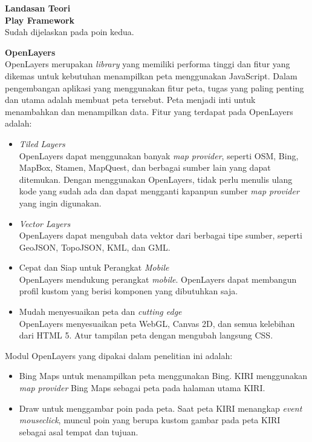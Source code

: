 \documentclass[a4paper,twoside]{article}
\begin{document}
\begin{enumerate}
	
	
\textbf{Landasan Teori}\\

\textbf{Play Framework}\\
Sudah dijelaskan pada poin kedua.

\textbf{OpenLayers}\\
OpenLayers \cite{openlayersbook} merupakan \textit{library} yang memiliki performa tinggi dan fitur yang dikemas untuk kebutuhan menampilkan peta menggunakan JavaScript. Dalam pengembangan aplikasi yang menggunakan fitur peta, tugas yang paling penting dan utama adalah membuat peta tersebut. Peta menjadi inti untuk menambahkan dan menampilkan data. Fitur yang terdapat pada OpenLayers adalah:

\begin{itemize}
\item \textit{Tiled Layers}\\
			OpenLayers dapat menggunakan banyak \textit{map provider}, seperti OSM, Bing, MapBox, Stamen, MapQuest, dan berbagai sumber lain yang dapat ditemukan. Dengan menggunakan OpenLayers, tidak perlu menulis ulang kode yang sudah ada dan dapat mengganti kapanpun sumber \textit{map provider} yang ingin digunakan.
	\item \textit{Vector Layers}\\
			OpenLayers dapat mengubah data vektor dari berbagai tipe sumber, seperti GeoJSON, TopoJSON, KML, dan GML.
	\item Cepat dan Siap untuk Perangkat \textit{Mobile}\\
			OpenLayers mendukung perangkat \textit{mobile}. OpenLayers dapat membangun profil kustom yang berisi komponen yang dibutuhkan saja.
	\item Mudah menyesuaikan peta dan \textit{cutting edge}\\
			OpenLayers menyesuaikan peta WebGL, Canvas 2D, dan semua kelebihan dari HTML 5. Atur tampilan peta dengan mengubah langsung CSS.
\end{itemize}

Modul OpenLayers yang dipakai dalam penelitian ini adalah:
\begin{itemize}
	\item 	Bing Maps untuk menampilkan peta menggunakan Bing. KIRI menggunakan \textit{map provider} Bing Maps sebagai peta pada halaman utama KIRI. 
	\item Draw untuk menggambar poin pada peta. Saat peta KIRI menangkap \textit{event mouseclick}, muncul poin yang berupa kustom gambar pada peta KIRI sebagai asal tempat dan tujuan. 
\end{itemize}


\end{enumerate}
\end{document}
